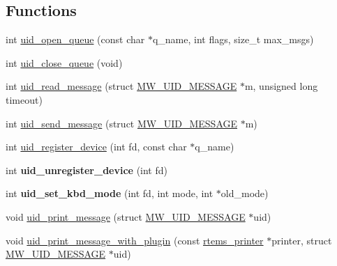 \subsection*{Functions}
\begin{DoxyCompactItemize}
\item 
int \mbox{\hyperlink{group__libmisc__fb__mw_ga36e445e26f099ddfd3a06d9321d3b409}{uid\+\_\+open\+\_\+queue}} (const char $\ast$q\+\_\+name, int flags, size\+\_\+t max\+\_\+msgs)
\item 
int \mbox{\hyperlink{group__libmisc__fb__mw_gad090bd08bb16286d82e213d424e561ff}{uid\+\_\+close\+\_\+queue}} (void)
\item 
int \mbox{\hyperlink{group__libmisc__fb__mw_ga9e9231ef99e54e115e879a01da755156}{uid\+\_\+read\+\_\+message}} (struct \mbox{\hyperlink{structMW__UID__MESSAGE}{M\+W\+\_\+\+U\+I\+D\+\_\+\+M\+E\+S\+S\+A\+GE}} $\ast$m, unsigned long timeout)
\item 
int \mbox{\hyperlink{group__libmisc__fb__mw_ga77f13b23a62c5fbf423890dbe8c4d398}{uid\+\_\+send\+\_\+message}} (struct \mbox{\hyperlink{structMW__UID__MESSAGE}{M\+W\+\_\+\+U\+I\+D\+\_\+\+M\+E\+S\+S\+A\+GE}} $\ast$m)
\item 
int \mbox{\hyperlink{group__libmisc__fb__mw_ga535fea8a50f594df9a49f36950b4e806}{uid\+\_\+register\+\_\+device}} (int fd, const char $\ast$q\+\_\+name)
\item 
\mbox{\label{group__libmisc__fb__mw_gaa55b98eacc5110e5ee3335193f6b821e}} 
int {\bfseries uid\+\_\+unregister\+\_\+device} (int fd)
\item 
\mbox{\label{group__libmisc__fb__mw_gad4637f10b62d6355208367a7db2b4534}} 
int {\bfseries uid\+\_\+set\+\_\+kbd\+\_\+mode} (int fd, int mode, int $\ast$old\+\_\+mode)
\item 
void \mbox{\hyperlink{group__libmisc__fb__mw_ga7266208fe16f89c75b32ea0dcc0c1a92}{uid\+\_\+print\+\_\+message}} (struct \mbox{\hyperlink{structMW__UID__MESSAGE}{M\+W\+\_\+\+U\+I\+D\+\_\+\+M\+E\+S\+S\+A\+GE}} $\ast$uid)
\item 
void \mbox{\hyperlink{group__libmisc__fb__mw_gaa764fb7bdb39ac0add4c36bc9d510f41}{uid\+\_\+print\+\_\+message\+\_\+with\+\_\+plugin}} (const \mbox{\hyperlink{structrtems__printer}{rtems\+\_\+printer}} $\ast$printer, struct \mbox{\hyperlink{structMW__UID__MESSAGE}{M\+W\+\_\+\+U\+I\+D\+\_\+\+M\+E\+S\+S\+A\+GE}} $\ast$uid)
\end{DoxyCompactItemize}


